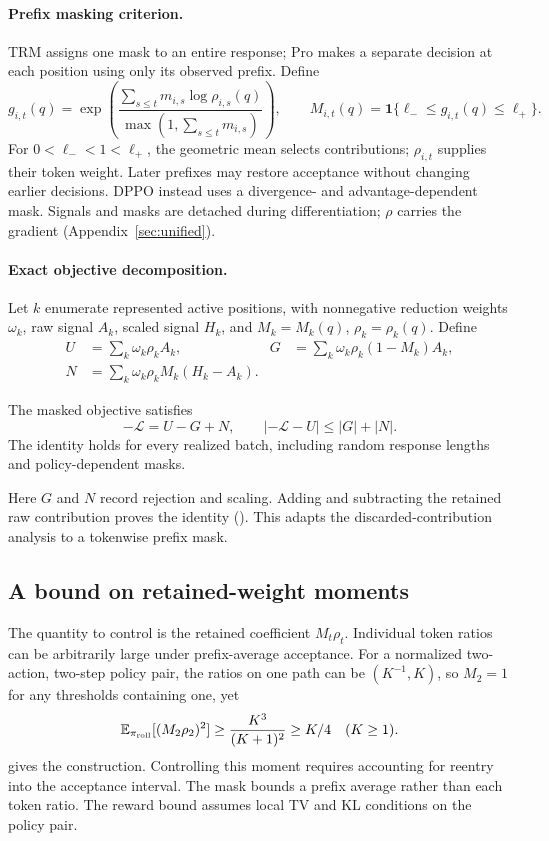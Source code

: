 \paragraph{Prefix masking criterion.}
TRM assigns one mask to an entire response; Pro makes a separate decision
at each position using only its observed prefix. Define
\[
 g_{i,t}(q)=\exp\!\left(\frac{\sum_{s\le t}m_{i,s}\log\rho_{i,s}(q)}
 {\max(1,\sum_{s\le t}m_{i,s})}\right),\qquad
 M_{i,t}(q)=\mathbf1\{\ell_-\le g_{i,t}(q)\le\ell_+\}.
\]
For $0<\ell_-<1<\ell_+$, the geometric mean selects contributions;
$\rho_{i,t}$ supplies their token weight. Later prefixes may restore acceptance
without changing earlier decisions. DPPO instead uses a divergence- and
advantage-dependent mask. Signals and masks are detached during differentiation;
$\rho$ carries the gradient (Appendix~\ref{sec:unified}).

\paragraph{Exact objective decomposition.}
Let $k$ enumerate represented active positions, with nonnegative reduction
weights $\omega_k$, raw signal $A_k$, scaled signal $H_k$, and
$M_k=M_k(q)$, $\rho_k=\rho_k(q)$. Define
\begin{align*}
 U&=\sum_k\omega_k\rho_k A_k,&
 G&=\sum_k\omega_k\rho_k(1-M_k)A_k,\\
 N&=\sum_k\omega_k\rho_k M_k(H_k-A_k).
\end{align*}
\begin{proposition}
The masked objective satisfies
\[
 -\mathcal L=U-G+N,\qquad
 |-\mathcal L-U|\le |G|+|N|.
\]
The identity holds for every realized batch, including random response
lengths and policy-dependent masks.
\end{proposition}
Here $G$ and $N$ record rejection and scaling. Adding and subtracting
the retained raw contribution proves the identity
(). This adapts the discarded-contribution
analysis \citep[Section~1.3]{li2025sequencemasking} to a tokenwise prefix mask.

\subsection{A bound on retained-weight moments}
The quantity to control is the retained coefficient $M_t\rho_t$.
Individual token ratios can be arbitrarily large under prefix-average acceptance.
For a normalized two-action, two-step policy pair, the ratios on one path
can be $(K^{-1},K)$, so $M_2=1$ for any thresholds containing one, yet
\[
 \mathbb E_{\pi_{\mathrm{roll}}}[(M_2\rho_2)^2]
 \ge \frac{K^3}{(K+1)^2}\ge K/4\quad(K\ge1).
\]
 gives the construction. Controlling this
moment requires accounting for reentry into the acceptance interval.
The mask bounds a prefix average rather than each token ratio.
The reward bound assumes local TV and KL conditions on the policy pair.


